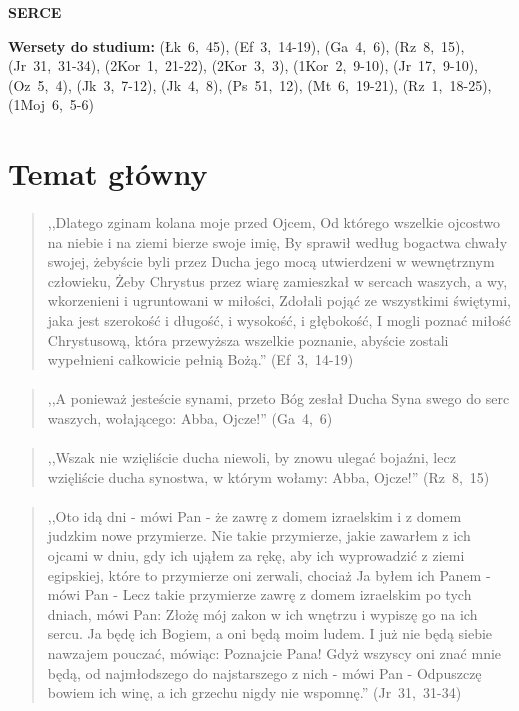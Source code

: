 \documentclass[10pt,a4paper,oneside]{article}
\begin{document}
\centerline{\textbf{\MakeUppercase{Serce}}}
\begin{center}
\textbf{Wersety do studium:} \mbox{(Łk 6, 45)}, \mbox{(Ef 3, 14-19)}, \mbox{(Ga 4, 6)}, \mbox{(Rz 8, 15)}, \mbox{(Jr 31, 31-34)}, \mbox{(2Kor 1, 21-22)}, \mbox{(2Kor 3, 3)}, \mbox{(1Kor 2, 9-10)}, \mbox{(Jr 17, 9-10)}, \mbox{(Oz 5, 4)}, \mbox{(Jk 3, 7-12)}, \mbox{(Jk 4, 8)}, \mbox{(Ps 51, 12)}, \mbox{(Mt 6, 19-21)}, \mbox{(Rz 1, 18-25)}, \mbox{(1Moj 6, 5-6)}
\end{center}
\section{Temat główny}
\paragraph{}
\begin{quote}
,,Dlatego zginam kolana moje przed Ojcem, Od którego wszelkie ojcostwo na niebie i na ziemi bierze swoje imię, By sprawił według bogactwa chwały swojej, żebyście byli przez Ducha jego mocą utwierdzeni w wewnętrznym człowieku, Żeby Chrystus przez wiarę zamieszkał w sercach waszych, a wy, wkorzenieni i ugruntowani w miłości, Zdołali pojąć ze wszystkimi świętymi, jaka jest szerokość i długość, i wysokość, i głębokość, I mogli poznać miłość Chrystusową, która przewyższa wszelkie poznanie, abyście zostali wypełnieni całkowicie pełnią Bożą.'' \mbox{(Ef 3, 14-19)}
\end{quote}
\paragraph{}
\begin{quote}
,,A ponieważ jesteście synami, przeto Bóg zesłał Ducha Syna swego do serc waszych, wołającego: Abba, Ojcze!'' \mbox{(Ga 4, 6)}
\end{quote}
\paragraph{}
\begin{quote}
,,Wszak nie wzięliście ducha niewoli, by znowu ulegać bojaźni, lecz wzięliście ducha synostwa, w którym wołamy: Abba, Ojcze!'' \mbox{(Rz 8, 15)}
\end{quote}
\paragraph{}
\begin{quote}
,,Oto idą dni - mówi Pan - że zawrę z domem izraelskim i z domem judzkim nowe przymierze. Nie takie przymierze, jakie zawarłem z ich ojcami w dniu, gdy ich ująłem za rękę, aby ich wyprowadzić z ziemi egipskiej, które to przymierze oni zerwali, chociaż Ja byłem ich Panem - mówi Pan - Lecz takie przymierze zawrę z domem izraelskim po tych dniach, mówi Pan: Złożę mój zakon w ich wnętrzu i wypiszę go na ich sercu. Ja będę ich Bogiem, a oni będą moim ludem. I już nie będą siebie nawzajem pouczać, mówiąc: Poznajcie Pana! Gdyż wszyscy oni znać mnie będą, od najmłodszego do najstarszego z nich - mówi Pan - Odpuszczę bowiem ich winę, a ich grzechu nigdy nie wspomnę.'' \mbox{(Jr 31, 31-34)}
\end{quote}
\end{document}
